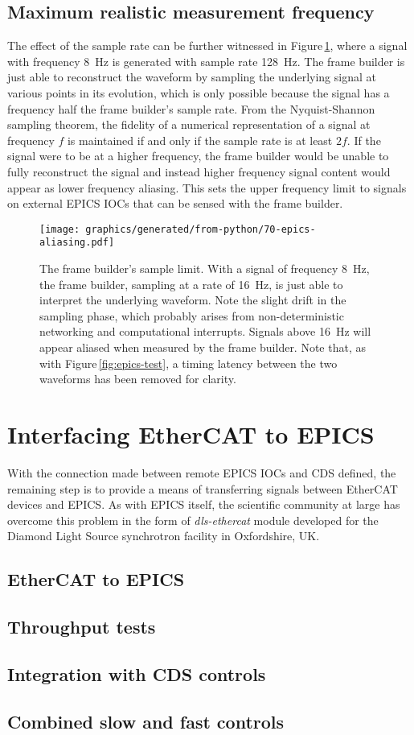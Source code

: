 \subsection{Maximum realistic measurement frequency}
The effect of the sample rate can be further witnessed in Figure\,\ref{fig:sample-aliasing}, where a signal with frequency \SI{8}{\hertz} is generated with sample rate \SI{128}{\hertz}. The frame builder is just able to reconstruct the waveform by sampling the underlying signal at various points in its evolution, which is only possible because the signal has a frequency half the frame builder's sample rate. From the Nyquist-Shannon sampling theorem, the fidelity of a numerical representation of a signal at frequency $f$ is maintained if and only if the sample rate is at least $2f$. If the signal were to be at a higher frequency, the frame builder would be unable to fully reconstruct the signal and instead higher frequency signal content would appear as lower frequency aliasing. This sets the upper frequency limit to signals on external \gls{EPICS} \glspl{IOC} that can be sensed with the frame builder.

\begin{figure}
  \centering
  \texttt{[image: graphics/generated/from-python/70-epics-aliasing.pdf]}
  \caption{\label{fig:sample-aliasing}The frame builder's sample limit. With a signal of frequency \SI{8}{\hertz}, the frame builder, sampling at a rate of \SI{16}{\hertz}, is just able to interpret the underlying waveform. Note the slight drift in the sampling phase, which probably arises from non-deterministic networking and computational interrupts. Signals above \SI{16}{\hertz} will appear aliased when measured by the frame builder. Note that, as with Figure\,\ref{fig:epics-test}, a timing latency between the two waveforms has been removed for clarity.}
\end{figure}

\section{Interfacing EtherCAT to EPICS}
With the connection made between remote \gls{EPICS} \glspl{IOC} and \gls{CDS} defined, the remaining step is to provide a means of transferring signals between EtherCAT devices and \gls{EPICS}. As with \gls{EPICS} itself, the scientific community at large has overcome this problem in the form of \emph{dls-ethercat} module developed for the Diamond Light Source synchrotron facility in Oxfordshire, UK.

\subsection{EtherCAT to EPICS}

\subsection{Throughput tests}

\subsection{Integration with CDS controls}

\subsection{Combined slow and fast controls}
